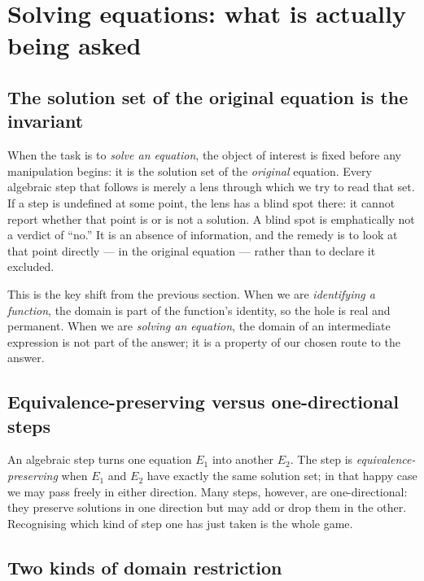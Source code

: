 \documentclass{essay}
\begin{document}
\section{Solving equations: what is actually being asked}

\subsection{The solution set of the original equation is the invariant}

When the task is to \emph{solve an equation}, the object of interest is fixed before any
manipulation begins: it is the solution set of the \emph{original} equation. Every algebraic
step that follows is merely a lens through which we try to read that set. If a step is
undefined at some point, the lens has a blind spot there: it cannot report whether that
point is or is not a solution. A blind spot is emphatically not a verdict of ``no.'' It is
an absence of information, and the remedy is to look at that point directly --- in the
original equation --- rather than to declare it excluded.

This is the key shift from the previous section. When we are \emph{identifying a function},
the domain is part of the function's identity, so the hole is real and permanent. When we
are \emph{solving an equation}, the domain of an intermediate expression is not part of the
answer; it is a property of our chosen route to the answer.

\subsection{Equivalence-preserving versus one-directional steps}

An algebraic step turns one equation \(E_{1}\) into another \(E_{2}\). The step is
\emph{equivalence-preserving} when \(E_{1}\) and \(E_{2}\) have exactly the same solution set; in
that happy case we may pass freely in either direction. Many steps, however, are
one-directional: they preserve solutions in one direction but may add or drop them in the
other. Recognising which kind of step one has just taken is the whole game.

\subsection{Two kinds of domain restriction}
\end{document}

